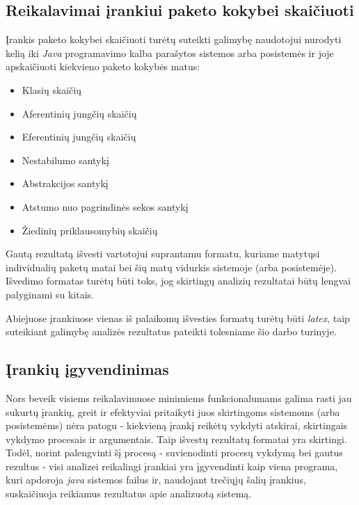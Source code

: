 \subsection{Reikalavimai įrankiui paketo kokybei skaičiuoti}
Įrankis paketo kokybei skaičiuoti turėtų suteikti galimybę naudotojui nurodyti kelią iki \textit{Java} programavimo kalba parašytos sistemos arba posistemės ir joje
apskaičiuoti kiekvieno paketo kokybės matus:
\begin{itemize}
    \item Klasių skaičių
    \item Aferentinių jungčių skaičių
    \item Eferentinių jungčių skaičių
    \item Nestabilumo santykį
    \item Abstrakcijos santykį
    \item Atstumo nuo pagrindinės sekos santykį
    \item Žiedinių priklausomybių skaičių
\end{itemize}
Gautą rezultatą išvesti vartotojui suprantamu formatu, kuriame matytųsi individualių paketų matai bei šių matų vidurkis sistemoje (arba posistemėje).
Išvedimo formatas turėtų būti toks, jog skirtingų analizių rezultatai būtų lengvai palyginami su kitais.

Abiejuose įrankiuose vienas iš palaikomų išvesties formatų turėtų būti \textit{latex}, taip suteikiant galimybę analizės rezultatus pateikti tolesniame šio darbo turinyje.

\subsection{Įrankių įgyvendinimas}
Nors beveik visiems reikalavimuose minimiems funkcionalumams galima rasti jau sukurtų įrankių, greit ir efektyviai pritaikyti juos skirtingoms sistemoms
(arba posistemėms) nėra patogu - kiekvieną įrankį reikėtų vykdyti atskirai, skirtingais vykdymo procesais ir argumentais.
Taip išvestų rezultatų formatai yra skirtingi.
Todėl, norint palengvinti šį procesą - suvienodinti procesų vykdymą bei gautus rezultus - visi analizei reikalingi įrankiai yra įgyvendinti kaip viena programa, kuri
apdoroja \textit{java} sistemos failus ir, naudojant trečiųjų šalių įrankius, suskaičiuoja reikiamus rezultatus apie analizuotą sistemą.

